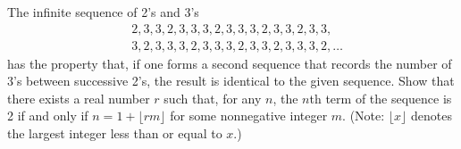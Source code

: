 The infinite sequence of 2's and 3's
\begin{align*}
&2,3,3,2,3,3,3,2,3,3,3,2,3,3,2,3,3, \\
&3,2,3,3,3,2,3,3,3,2,3,3,2,3,3,3,2,\dots
\end{align*}
has the property that, if one forms a second sequence that records the
number of 3's between successive 2's, the result is identical to the
given sequence. Show that there exists a real number $r$ such that, for
any $n$, the $n$th term of the sequence is 2 if and only if $n = 1 +
\lfloor rm \rfloor$ for some nonnegative integer $m$. (Note: $\lfloor x
\rfloor$ denotes the largest integer less than or equal to $x$.)
